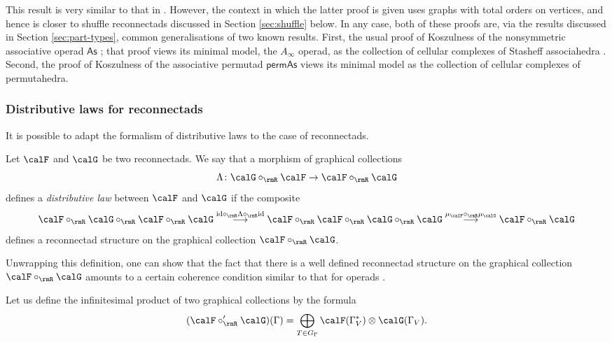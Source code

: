 This result is very similar to that in \cite{jlms.12596}. However, the context in which the latter proof is given uses graphs with total orders on vertices, and hence is closer to shuffle reconnectads discussed in Section \ref{sec:shuffle} below. In any case, both of these proofs are, via the results discussed in Section \ref{sec:part-types}, common generalisations of two known results. First, the usual proof of Koszulness of the nonsymmetric associative operad $\mathsf{As}$ \cite{MR2954392}; that proof views its minimal model, the $A_\infty$ operad, as the collection of cellular complexes of Stasheff associahedra \cite{MR0158400}. Second, the proof of Koszulness of the associative permutad $\mathsf{permAs}$ \cite{MR2995045} views its minimal model as the collection of cellular complexes of permutahedra.

\subsubsection{Distributive laws for reconnectads}

It is possible to adapt the formalism of distributive laws \cite{MR1393517} to the case of reconnectads.

\begin{defi}
Let $\calF$ and $\calG$ be two reconnectads. We say that a morphism of graphical collections
\[
    \Lambda\colon \calG \circ_{\rmR} \calF \rightarrow \calF \circ_{\rmR} \calG
\]
defines a \emph{distributive law} between $\calF$ and $\calG$ if the composite 
 \[
\calF\circ_{\rmR}\calG\circ_{\rmR}\calF\circ_{\rmR}\calG\stackrel{\mathrm{id}\circ_{\rmR}\Lambda\circ_{\rmR}\mathrm{id} }{\longrightarrow}  
\calF\circ_{\rmR}\calF\circ_{\rmR}\calG\circ_{\rmR}\calG
\stackrel{\mu_{\calF}\circ_{\rmR}\mu_{\calG}}{\longrightarrow}\calF\circ_{\rmR}\calG
 \]
defines a reconnectad structure on the graphical collection $\calF\circ_{\rmR}\calG$. 
\end{defi}

\begin{rema}
Unwrapping this definition, one can show that the fact that there is a well defined reconnectad structure on the graphical collection $\calF\circ_{\rmR}\calG$ amounts to a certain coherence condition similar to that for operads \cite{MR1393517}.
\end{rema}

Let us define the infinitesimal product of two graphical collections by the formula
 \[
(\calF \circ'_{\rmR} \calG)(\Gamma) = \bigoplus_{T\in G_\Gamma} \calF(\Gamma^*_{V}) \otimes \calG(\Gamma_{V}).
\] 

